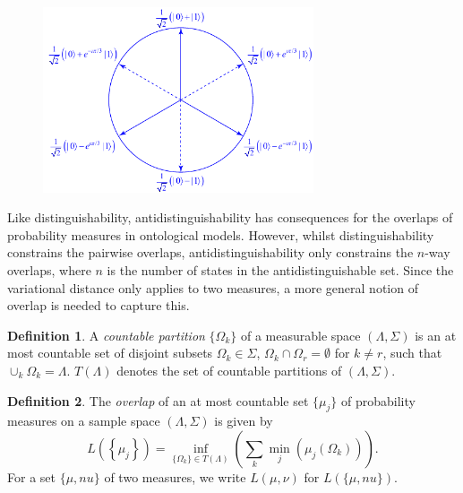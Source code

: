 \documentclass[DIV=calc,paper=a4,fontsize=11pt,twocolumn]{scrartcl} %
\theoremstyle{definition}
\newtheorem{definition}{Definition}[section]
\theoremstyle{plain}
\begin{document}
\begin{figure}[t!]
\centering
\includegraphics[width=80mm]{Fig11.pdf}
\caption{}
\end{figure}

Like distinguishability, antidistinguishability has consequences for
the overlaps of probability measures in ontological models.  However,
whilst distinguishability constrains the pairwise overlaps,
antidistinguishability only constrains the $n$-way overlaps, where $n$
is the number of states in the antidistinguishable set.  Since the
variational distance only applies to two measures, a more general
notion of overlap is needed to capture this.

\begin{definition}
\label{def:Anti:partition}
A \emph{countable partition} $\{\Omega_k\}$ of a measurable space
$(\Lambda, \Sigma)$ is an at most countable set of disjoint subsets
$\Omega_k \in \Sigma$, $\Omega_k \cap \Omega_r = \emptyset$ for $k
\neq r$, such that $\cup_k \Omega_k = \Lambda$.  $T(\Lambda)$
denotes the set of countable partitions of $(\Lambda,\Sigma)$.
\end{definition}

\begin{definition}
\label{def:Anti:overlap}
The \emph{overlap} of an at most countable set $\{\mu_j\}$ of
probability measures on a sample space $(\Lambda, \Sigma) $ is given
by
\begin{equation}
\label{eq:Anti:overlap}
L \left ( \left \{ \mu_j \right \} \right ) = \inf_{\{\Omega_k\}
\in T(\Lambda)} \left ( \sum_k \min_j \left (
\mu_j(\Omega_k) \right ) \right ).
\end{equation}
For a set $\{\mu,nu\}$ of two measures, we write $L(\mu,\nu)$ for
$L(\{\mu,nu\})$.
\end{definition}
\end{document}
